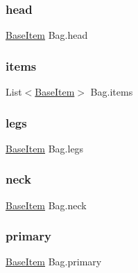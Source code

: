\mbox{\label{class_bag_aad83c56a14d611f6e1d2fac81903d66c}} 
\subsubsection{\texorpdfstring{head}{head}}
{\footnotesize\ttfamily \mbox{\hyperlink{class_base_item}{Base\+Item}} Bag.\+head\hspace{0.3cm}{\ttfamily [get]}}

\mbox{\label{class_bag_a06d313b5ecfa35740d11e1613d1a7695}} 
\subsubsection{\texorpdfstring{items}{items}}
{\footnotesize\ttfamily List$<$\mbox{\hyperlink{class_base_item}{Base\+Item}}$>$ Bag.\+items\hspace{0.3cm}{\ttfamily [get]}}

\mbox{\label{class_bag_a06fc81d3974eb764db9be3fda8e63284}} 
\subsubsection{\texorpdfstring{legs}{legs}}
{\footnotesize\ttfamily \mbox{\hyperlink{class_base_item}{Base\+Item}} Bag.\+legs\hspace{0.3cm}{\ttfamily [get]}}

\mbox{\label{class_bag_a6796ecd4f3c30c4514d45cce11b1907c}} 
\subsubsection{\texorpdfstring{neck}{neck}}
{\footnotesize\ttfamily \mbox{\hyperlink{class_base_item}{Base\+Item}} Bag.\+neck\hspace{0.3cm}{\ttfamily [get]}}

\mbox{\label{class_bag_af0d1113dd35f217846e53dd477071db1}} 
\subsubsection{\texorpdfstring{primary}{primary}}
{\footnotesize\ttfamily \mbox{\hyperlink{class_base_item}{Base\+Item}} Bag.\+primary\hspace{0.3cm}{\ttfamily [get]}}

